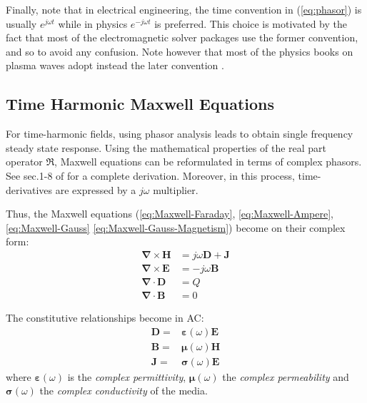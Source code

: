Finally, note that in electrical engineering, the time convention in (\ref{eq:phasor}) is usually $e^{j\omega t}$ while in physics $e^{-j\omega t}$ is preferred\parencite{Bradley2007, Michelsen2017}. This choice is motivated by the fact that most of the electromagnetic solver packages use the former convention, and so to avoid any confusion. Note however that most of the physics books on plasma waves adopt instead the later convention \parencite{Swanson2003, Stix1992, Brambilla1998}.


\subsection{Time Harmonic Maxwell Equations}
For time-harmonic fields, using phasor analysis leads to obtain single frequency steady state response. Using the mathematical properties of the real part operator $\Re$, Maxwell equations can be reformulated in terms of complex phasors. See sec.1-8 of \parencite{Harrington2001} for a complete derivation. Moreover, in this process, time-derivatives are expressed by a $j\omega$ multiplier.  

Thus, the Maxwell equations (\ref{eq:Maxwell-Faraday}, \ref{eq:Maxwell-Ampere}, \ref{eq:Maxwell-Gauss} \ref{eq:Maxwell-Gauss-Magnetism}) become on their complex form:
\begin{subequations}
 \begin{align}
  \boldsymbol{\nabla} \times \mathbf{H} &= j\omega\mathbf{D} + \mathbf{J}  \label{eq:Maxwell-Faraday-Harmonic} \\
  \boldsymbol{\nabla} \times \mathbf{E} &= -j\omega\mathbf{B} \label{eq:Maxwell-Ampere-Harmonic} \\
  \boldsymbol{\nabla} \cdot \mathbf{D} &= Q \label{eq:Maxwell-Gauss-Harmonic} \\
  \boldsymbol{\nabla} \cdot \mathbf{B} &= 0 \label{eq:Maxwell-Gauss-Magnetism-Harmonic} 
 \end{align}
\end{subequations}

The constitutive relationships become in AC:
\begin{subequations}
 \begin{align}
  \mathbf{D} =& \boldsymbol{\varepsilon}(\omega) \mathbf{E} \\
  \mathbf{B} =& \boldsymbol{\mu}(\omega) \mathbf{H} \\
  \mathbf{J} =& \boldsymbol{\sigma}(\omega) \mathbf{E}
 \end{align}
\end{subequations}
where $\boldsymbol{\varepsilon}(\omega)$ is the \emph{complex permittivity}, $\boldsymbol{\mu}(\omega)$ the \emph{complex permeability} and $\boldsymbol{\sigma}(\omega)$ the \emph{complex conductivity} of the media. 

